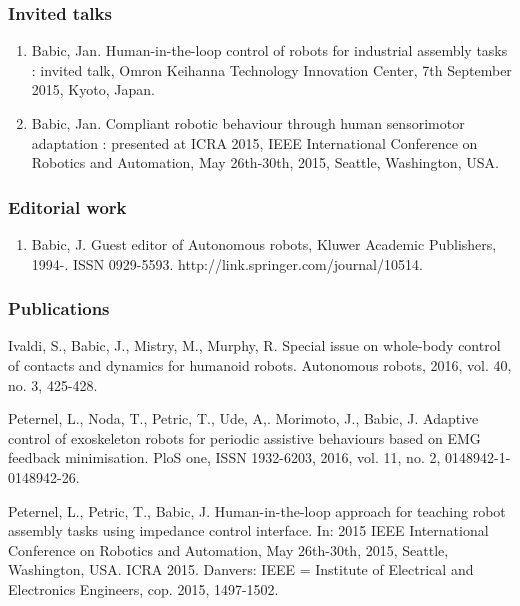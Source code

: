 \subsubsection{Invited talks}

\begin{enumerate}

\item Babic, Jan. Human-in-the-loop control of robots for industrial assembly tasks : invited talk, Omron Keihanna Technology Innovation Center, 7th September 2015, Kyoto, Japan.

\item Babic, Jan. Compliant robotic behaviour through human sensorimotor adaptation : presented at ICRA 2015, IEEE International Conference on Robotics and Automation, May 26th-30th, 2015, Seattle, Washington, USA.

\end{enumerate}

\subsubsection{Editorial work}

\begin{enumerate}
	
\item Babic, J. Guest editor of Autonomous robots, Kluwer Academic Publishers, 1994-. ISSN 0929-5593. http://link.springer.com/journal/10514.

\end{enumerate}

\subsubsection{Publications}

Ivaldi, S., Babic, J., Mistry, M., Murphy, R. Special issue on whole-body control of contacts and dynamics for humanoid robots. Autonomous robots, 2016, vol. 40, no. 3, 425-428.
 
Peternel, L., Noda, T., Petric, T., Ude, A,. Morimoto, J., Babic, J. Adaptive control of exoskeleton robots for periodic assistive behaviours based on EMG feedback minimisation. PloS one, ISSN 1932-6203, 2016, vol. 11, no. 2, 0148942-1-0148942-26.

Peternel, L., Petric, T., Babic, J. Human-in-the-loop approach for teaching robot assembly tasks using impedance control interface. In: 2015 IEEE International Conference on Robotics and Automation, May 26th-30th, 2015, Seattle, Washington, USA. ICRA 2015. Danvers: IEEE = Institute of Electrical and Electronics Engineers, cop. 2015, 1497-1502.

